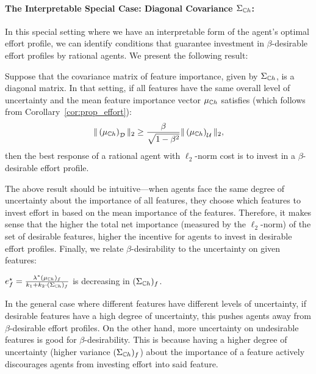 \paragraph{The Interpretable Special Case: Diagonal Covariance $\Sigma_{\mathbb{C} h}$:}
In this special setting where we have an interpretable form of the agent's optimal effort profile, we can identify conditions that guarantee investment in $\beta$-desirable effort profiles by rational agents. We present the following result:
\begin{cor}\label{corr:beta_model2}
Suppose that the covariance matrix of feature importance, given by $\Sigma_{\mathbb{C} h}$, is a diagonal matrix. In that setting, if all features have the same overall level of uncertainty and the mean feature importance vector $\mu_{\mathbb{C} h}$ satisfies (which follows from Corollary~\ref{cor:prop_effort}): 
\[
      \| \left(\mu_{\mathbb{C} h}\right)_{\mathcal{D}} \|_2 \geq  \frac{\beta}{\sqrt{1-\beta^2}} \| \left(\mu_{\mathbb{C} h}\right)_{\mathcal{U}} \|_2,
\]
then the best response of a rational agent with $\ell_2$-norm cost is to invest in a $\beta$-desirable effort profile. 
\end{cor}

The above result should be intuitive---when agents face the same degree of uncertainty about the importance of all features, they choose which features to invest effort in based on the mean importance of the features. Therefore, it makes sense that the higher the total net importance (measured by the $\ell_2$-norm) of the set of desirable features, higher the incentive for agents to invest in desirable effort profiles. Finally, we relate $\beta$-desirability to the uncertainty on given features: 

\begin{cor}\label{cor:prop_effort_variance}
$e^{\star}_f =  \frac{\lambda^*(\mu_{\mathbb{C} h})_f}{k_1 + k_2 \cdot (\Sigma_{\mathbb{C} h})_f}$
is decreasing in $(\Sigma_{\mathbb{C} h})_f$.
\end{cor}

In the general case where different features have different levels of uncertainty, if desirable features have a high degree of uncertainty, this pushes agents away from $\beta$-desirable effort profiles. On the other hand, more uncertainty on undesirable features is good for $\beta$-desirability. This is because having a higher degree of uncertainty (higher variance $(\Sigma_{\mathbb{C} h})_f$) about the importance of a feature actively discourages agents from investing effort into said feature. 


